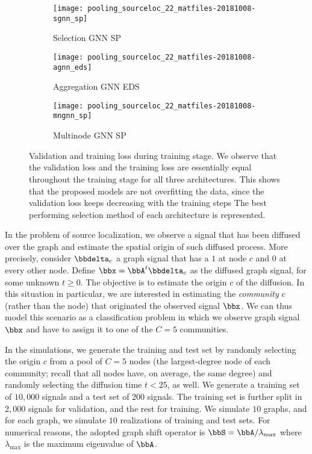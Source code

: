 \begin{figure*}
\centering
\begin{subfigure}{.33\textwidth}
  \centering
  \texttt{[image: pooling\_sourceloc\_22\_matfiles-20181008-sgnn\_sp]}
  \caption{Selection GNN SP}
  \label{fig:a}
\end{subfigure}%
\hfill
\begin{subfigure}{.33\textwidth}
  \centering
  \texttt{[image: pooling\_sourceloc\_22\_matfiles-20181008-agnn\_eds]}
  \caption{Aggregation GNN EDS}
  \label{fig:mn_P}
\end{subfigure}%
\hfill
\begin{subfigure}{.33\textwidth}
  \centering
  \texttt{[image: pooling\_sourceloc\_22\_matfiles-20181008-mngnn\_sp]}
  \caption{Multinode GNN SP}
  \label{fig:mn_Q}
\end{subfigure}%
\caption{Validation and training loss during training stage. We observe that the validation loss and the training loss are essentially equal throughout the training stage for all three architectures. This shows that the proposed models are not overfitting the data, since the validation loss keeps decreasing with the training steps The best performing selection method of each architecture is represented.}
\label{fig:validation}
\end{figure*}

In the problem of source localization, we observe a signal that has been diffused over the graph and estimate the spatial origin of such diffused process. More precisely, consider $\bbdelta_{c}$ a graph signal that has a $1$ at node $c$ and $0$ at every other node. Define $\bbx = \bbA^{t} \bbdelta_{c}$ as the diffused graph signal, for some unknown $t \geq 0$. The objective is to estimate the origin $c$ of the diffusion. In this situation in particular, we are interested in estimating the \emph{community} $c$ (rather than the node) that originated the observed signal $\bbx$. We can thus model this scenario as a classification problem in which we observe graph signal $\bbx$ and have to assign it to one of the $C=5$ communities.

In the simulations, we generate the training and test set by randomly selecting the origin $c$ from a pool of $C=5$ nodes (the largest-degree node of each community; recall that all nodes have, on average, the same degree) and randomly selecting the diffusion time $t<25$, as well. We generate a training set of $10,000$ signals and a test set of $200$ signals. The training set is further split in $2,000$ signals for validation, and the rest for training. We simulate $10$ graphs, and for each graph, we simulate $10$ realizations of training and test sets. For numerical reasons, the adopted graph shift operator is $\bbS = \bbA/\lambda_{\max}$ where $\lambda_{\max}$ is the maximum eigenvalue of $\bbA$.

